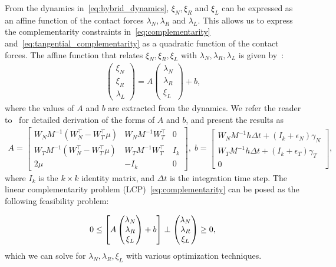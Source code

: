 From the dynamics in~\eqref{eq:hybrid_dynamics}, $\xi_N, \xi_R$ and $\xi_L$ can
be expressed as an affine function of the contact forces $\lambda_N, \lambda_R$
and $\lambda_L$.
%
This allows us to express the complementarity constraints
in~\eqref{eq:complementarity} and~\eqref{eq:tangential_complementarity} as a
quadratic function of the contact forces.
%
The affine function that relates $\xi_N, \xi_R, \xi_L$ with $\lambda_N,
\lambda_R, \lambda_L$ is given by~\cite{glocker2005formulation}: 
\begin{align*}
  \begin{pmatrix}
    \xi_N \\
    \xi_R \\
    \lambda_L
  \end{pmatrix} =
      A
    \begin{pmatrix}
      \lambda_N \\
      \lambda_R \\
      \xi_L
    \end{pmatrix} + b, 
\end{align*}
\noindent where the values of $A$ and $b$ are extracted from the dynamics. We
refer the reader to~\cite{glocker2005formulation} for detailed derivation of the
forms of $A$ and $b$, and present the results as
\begin{gather*}
    A = \begin{bmatrix}
      W_N M^{-1} (W_N^\top - W_T^\top \mu) & W_N M^{-1} W_T^\top & 0  \\
      W_T M^{-1} (W_N^\top - W_T^\top \mu) & W_T M^{-1} W_T^\top & I_k  \\
      2\mu & -I_k & 0
    \end{bmatrix}, \;  b = \begin{bmatrix}
      W_N M^{-1} h \Delta t + (I_k+\epsilon_N) \gamma_N\\
      W_T M^{-1} h \Delta t + (I_k+\epsilon_T) \gamma_T\\
      0
    \end{bmatrix}, 
\end{gather*}
\noindent where $I_k$ is the $k \times k$
identity matrix, and $\Delta t$ is the integration time step.
%
The linear complementarity problem (LCP)~\eqref{eq:complementarity} can be posed as
the following feasibility problem:

\begin{equation}
    0 \leq 
    \left[ A \begin{pmatrix}
      \lambda_N \\
      \lambda_R \\
      \xi_L
    \end{pmatrix} + b \right]
    \perp
    \begin{pmatrix}
      \lambda_N \\
      \lambda_R \\
      \xi_L
    \end{pmatrix} \geq 0, \\
  \label{eq:feasibility} 
\end{equation}
\noindent which we can solve for $\lambda_N, \lambda_R, \xi_L$ with various
optimization techniques. 

